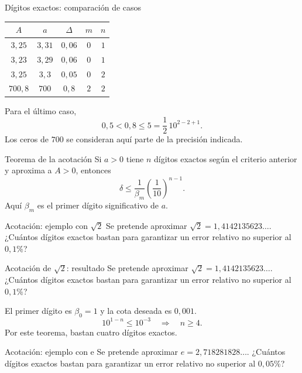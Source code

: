 \documentclass[original_version/main.tex]{subfiles}
\begin{document}
\begin{frame}{Dígitos exactos: comparación de casos}
\begin{center}\begin{tabular}{c|c|c|c|c}$A$&$a$&$\Delta$&$m$&$n$\\\hline $3{,}25$&$3{,}31$&$0{,}06$&$0$&$1$\\$3{,}23$&$3{,}29$&$0{,}06$&$0$&$1$\\$3{,}25$&$3{,}3$&$0{,}05$&$0$&$2$\\$700{,}8$&$700$&$0{,}8$&$2$&$2$\end{tabular}\end{center}Para el último caso,\[0{,}5<0{,}8\le5=\frac12\,10^{2-2+1}.\]Los ceros de $700$ se consideran aquí parte de la precisión indicada.
\end{frame}

\begin{frame}{Teorema de la acotación}
Si $a>0$ tiene $n$ dígitos exactos según el criterio anterior y aproxima a $A>0$, entonces\[\boxed{\delta\le\frac1{\beta_m}\left(\frac1{10}\right)^{n-1}.}\]Aquí $\beta_m$ es el primer dígito significativo de $a$.
\end{frame}

\begin{frame}{Acotación: ejemplo con \texorpdfstring{$\sqrt2$}{raíz de 2}}
Se pretende aproximar $\sqrt2=1{,}4142135623\ldots$. ¿Cuántos dígitos exactos bastan para garantizar un error relativo no superior al $0{,}1\%$?
\end{frame}

\begin{frame}{Acotación de \texorpdfstring{$\sqrt2$}{raíz de 2}: resultado}
Se pretende aproximar $\sqrt2=1{,}4142135623\ldots$. ¿Cuántos dígitos exactos bastan para garantizar un error relativo no superior al $0{,}1\%$?\par\medskip El primer dígito es $\beta_0=1$ y la cota deseada es $0{,}001$.\[10^{1-n}\le10^{-3}\quad\Longrightarrow\quad n\ge4.\]Por este teorema, bastan cuatro dígitos exactos.
\end{frame}

\begin{frame}{Acotación: ejemplo con e}
Se pretende aproximar $e=2{,}718281828\ldots$. ¿Cuántos dígitos exactos bastan para garantizar un error relativo no superior al $0{,}05\%$?
\end{frame}
\end{document}
